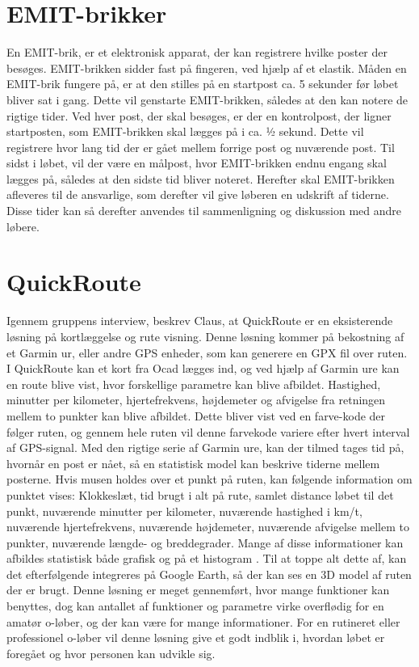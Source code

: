 \section{EMIT-brikker}
En EMIT-brik, er et elektronisk apparat, der kan registrere hvilke poster der besøges. EMIT-brikken sidder fast på fingeren, ved hjælp af et elastik. \newline
Måden en EMIT-brik fungere på, er at den stilles på en startpost ca. 5 sekunder før løbet bliver sat i gang. Dette vil genstarte EMIT-brikken, således at den kan notere de rigtige tider. 
Ved hver post, der skal besøges, er der en kontrolpost, der ligner startposten, som EMIT-brikken skal lægges på i ca. ½ sekund. Dette vil registrere hvor lang tid der er gået mellem forrige post og nuværende post. \newline
Til sidst i løbet, vil der være en målpost, hvor EMIT-brikken endnu engang skal lægges på, således at den sidste tid bliver noteret. 
Herefter skal EMIT-brikken afleveres til de ansvarlige, som derefter vil give løberen en udskrift af tiderne. Disse tider kan så derefter anvendes til sammenligning og diskussion med andre løbere.\citep{OOK}

\section{QuickRoute}
Igennem gruppens interview, beskrev Claus, at QuickRoute er en eksisterende løsning på kortlæggelse og rute visning. Denne løsning kommer på bekostning af et Garmin ur, eller andre GPS enheder, som kan generere en GPX fil over ruten. I QuickRoute kan et kort fra Ocad lægges ind, og ved hjælp af Garmin ure kan en route blive vist, hvor forskellige parametre kan blive afbildet. Hastighed, minutter per kilometer, hjertefrekvens, højdemeter og afvigelse fra retningen mellem to punkter kan blive afbildet. Dette bliver vist ved en farve-kode der følger ruten, og gennem hele ruten vil denne farvekode variere efter hvert interval af GPS-signal. Med den rigtige serie af Garmin ure, kan der tilmed tages tid på, hvornår en post er nået, så en statistisk model kan beskrive tiderne mellem posterne. Hvis musen holdes over et punkt på ruten, kan følgende information om punktet vises: Klokkeslæt, tid brugt i alt på rute, samlet distance løbet til det punkt, nuværende minutter per kilometer, nuværende hastighed i km/t, nuværende hjertefrekvens, nuværende højdemeter, nuværende afvigelse mellem to punkter, nuværende længde- og breddegrader. Mange af disse informationer kan afbildes statistisk både grafisk og på et histogram \citep{QR}.\newline
Til at toppe alt dette af, kan det efterfølgende integreres på Google Earth, så der kan ses en 3D model af ruten der er brugt. 
Denne løsning er meget gennemført, hvor mange funktioner kan benyttes, dog kan antallet af funktioner og parametre virke overflødig for en amatør o-løber, og der kan være for mange informationer. For en rutineret eller professionel o-løber vil denne løsning give et godt indblik i, hvordan løbet er foregået og hvor personen kan udvikle sig.


